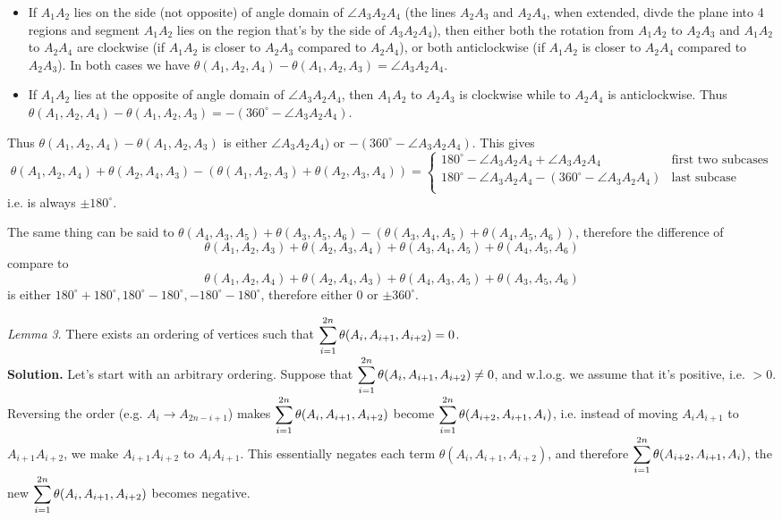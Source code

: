 \documentclass[11pt,a4paper]{article}
\begin{document}
\begin{enumerate}
\begin{itemize}
		\item If $A_1A_2$ lies on the side (not opposite) of angle domain of $\angle A_3A_2A_4$ (the lines $A_2A_3$ and $A_2A_4$, when extended, divde the plane into 4 regions and segment $A_1A_2$ lies on the region that's by the side of $A_3A_2A_4$), then either both the rotation from $A_1A_2$ to $A_2A_3$ and $A_1A_2$ to $A_2A_4$ are clockwise (if $A_1A_2$ is closer to $A_2A_3$ compared to $A_2A_4$), or both anticlockwise (if $A_1A_2$ is closer to $A_2A_4$ compared to $A_2A_3$). In both cases we have $\theta(A_1, A_2, A_4)-\theta(A_1, A_2, A_3)=\angle A_3A_2A_4$. 
		
		\item If $A_1A_2$ lies at the opposite of angle domain of $\angle A_3A_2A_4$, then $A_1A_2$ to $A_2A_3$ is clockwise while to $A_2A_4$ is anticlockwise. Thus $\theta(A_1, A_2, A_4)-\theta(A_1, A_2, A_3)=-(360^{\circ} - \angle A_3A_2A_4)$. 
	\end{itemize}
	
	Thus $\theta(A_1, A_2, A_4)-\theta(A_1, A_2, A_3)$ is either $\angle A_3A_2A_4)$ or $-(360^{\circ} - \angle A_3A_2A_4)$. This gives 
	\[
	\theta(A_1, A_2, A_4)+\theta(A_2, A_4, A_3) - (\theta(A_1, A_2, A_3)+\theta(A_2, A_3, A_4))=\begin{cases}
		180^{\circ} - \angle A_3A_2A_4 + \angle A_3A_2A_4 & \text{first two subcases}\\
		180^{\circ} - \angle A_3A_2A_4 -(360^{\circ} - \angle A_3A_2A_4)& \text{last subcase}\\
	\end{cases}
	\]
	i.e. is always $\pm 180^{\circ}$. 
	
	The same thing can be said to $\theta(A_4, A_3, A_5) + \theta (A_3, A_5, A_6)- (\theta(A_3, A_4, A_5) + \theta (A_4, A_5, A_6))$, therefore the difference of 
	\[
	\theta(A_1, A_2, A_3)+\theta(A_2, A_3, A_4)+\theta(A_3, A_4, A_5) + \theta (A_4, A_5, A_6)
	\]
	compare to 
	\[
	\theta(A_1, A_2, A_4)+\theta(A_2, A_4, A_3)+\theta(A_4, A_3, A_5) + \theta (A_3, A_5, A_6)
	\]
	is either $180^{\circ}+180^{\circ}, 180^{\circ}-180^{\circ}, -180^{\circ}-180^{\circ}$, therefore either 0 or $\pm 360^{\circ}$. 
	
	\emph{Lemma 3}. There exists an ordering of vertices such that $\displaystyle\sum_{i=1}^{2n}\theta(A_i, A_{i+1}, A_{i+2})=0$. \\
	\textbf{Solution.} Let's start with an arbitrary ordering. Suppose that $\displaystyle\sum_{i=1}^{2n}\theta(A_i, A_{i+1}, A_{i+2})\neq 0$, and w.l.o.g. we assume that it's positive, i.e. $>0$. Reversing the order (e.g. $A_{i}\to A_{2n-i+1}$) makes $\displaystyle\sum_{i=1}^{2n}\theta(A_i, A_{i+1}, A_{i+2})$ become $\displaystyle\sum_{i=1}^{2n}\theta(A_{i+2}, A_{i+1}, A_{i})$, i.e. instead of moving $A_iA_{i+1}$ to $A_{i+1}A_{i+2}$, we make $A_{i+1}A_{i+2}$ to $A_iA_{i+1}$. This essentially negates each term $\theta(A_i, A_{i+1}, A_{i+2})$, and therefore $\displaystyle\sum_{i=1}^{2n}\theta(A_{i+2}, A_{i+1}, A_{i})$, the new $\displaystyle\sum_{i=1}^{2n}\theta(A_i, A_{i+1}, A_{i+2})$ becomes negative. 
	

\end{enumerate}
\end{document}
